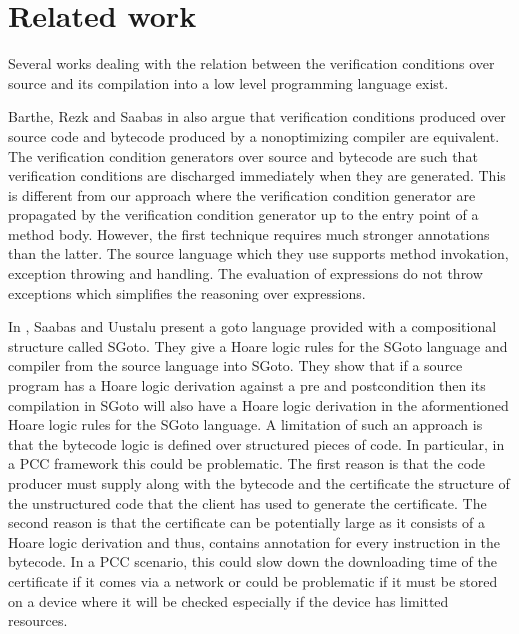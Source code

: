 \section{Related work}\label{pog:relWork}


Several works dealing with the relation between the 
verification conditions over source and its compilation into a low  level  programming  language exist.

Barthe, Rezk and Saabas in \cite{gta05:fast} also argue that verification conditions produced
over source code and bytecode produced by a nonoptimizing compiler   are equivalent.
 The verification condition generators over source and bytecode are such that verification conditions
are discharged immediately when they are generated. This is different from our approach where the
 verification condition generator are propagated by the verification condition generator
 up to the entry point of a method body. However, the first technique requires much stronger
 annotations than the latter. The source language which they use supports method invokation, exception throwing and handling.
The evaluation of expressions do not throw exceptions   which simplifies the reasoning over expressions.



In \cite{SU05CNS}, Saabas and Uustalu present a goto language provided with a compositional structure called SGoto.
They give a Hoare logic rules for the SGoto language and compiler from the source language into SGoto.
They show that if a source program has a Hoare logic derivation
 against a pre and postcondition then its compilation in SGoto will also have a Hoare
 logic derivation in the aformentioned Hoare logic rules for the SGoto language. 
A limitation of such an approach is that the bytecode logic is defined over structured pieces of code. 
In particular, in a  PCC framework this could be problematic. The first reason is that the code producer must supply along with the 
bytecode and the certificate the structure of the unstructured code that the client has used to
 generate the certificate. The second reason is that the certificate  can be potentially large  as it consists of a Hoare logic
 derivation and thus, contains annotation for every instruction in the bytecode. In a PCC scenario, this could slow down the downloading
time of the certificate if it comes via a network or could be problematic if it must be stored on a device  where it will be checked especially if the device
has limitted resources.

